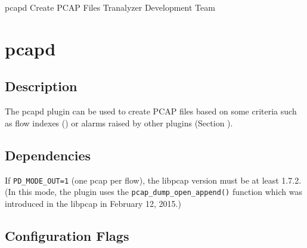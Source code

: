 \documentclass[documentation]{subfiles}
\begin{document}
\trantitle
    {pcapd}
    {Create PCAP Files}
    {Tranalyzer Development Team}

\section{pcapd}\label{s:pcapd}

\subsection{Description}
The pcapd plugin can be used to create PCAP files based on some criteria such as flow indexes () or alarms raised by other plugins (Section ).

\subsection{Dependencies}
If {\tt PD\_MODE\_OUT=1} (one pcap per flow), the libpcap version must be at least 1.7.2. (In this mode, the plugin uses the {\tt pcap\_dump\_open\_append()} function which was introduced in the libpcap in February 12, 2015.)

\subsection{Configuration Flags}
\end{document}
